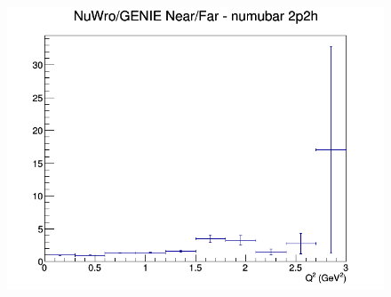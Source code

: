\documentclass[12pt]{article}
\begin{document}
\begin{figure}[h]
\endminipage
{}
\includegraphics[width=\linewidth]{eff_Q2/GAr/ratios/2p2h_NuWro_GENIE_numubar_NF_Q2.png}
\endminipage
\newline
\end{figure}
\clearpage
\end{document}
